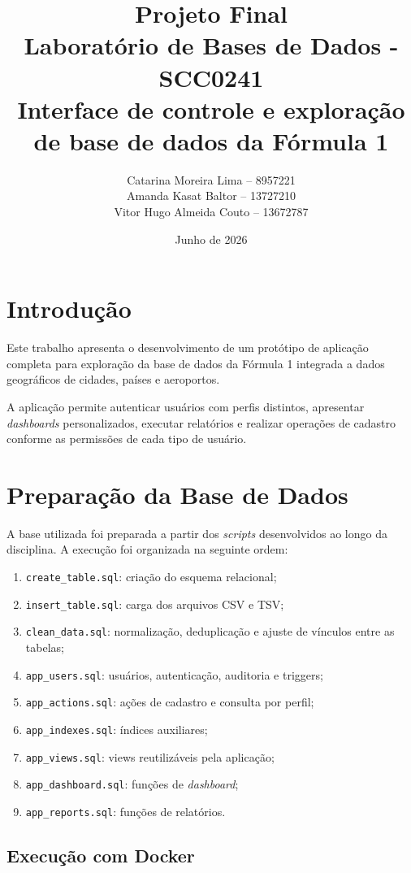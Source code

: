 \documentclass[12pt,a4paper]{article}
\title{
    \textbf{Projeto Final}\\
    Laboratório de Bases de Dados - SCC0241\\
    Interface de controle e exploração de base de dados da Fórmula 1
}
\author{
    Catarina Moreira Lima -- 8957221 \\
    Amanda Kasat Baltor -- 13727210 \\
    Vitor Hugo Almeida Couto -- 13672787
}
\date{Junho de 2026}
\begin{document}
\maketitle

\section{Introdução}

Este trabalho apresenta o desenvolvimento de um protótipo de aplicação completa para exploração da base de dados da Fórmula 1 integrada a dados geográficos de cidades, países e aeroportos.

A aplicação permite autenticar usuários com perfis distintos, apresentar \textit{dashboards} personalizados, executar relatórios e realizar operações de cadastro conforme as permissões de cada tipo de usuário.

\section{Preparação da Base de Dados}

A base utilizada foi preparada a partir dos \textit{scripts} desenvolvidos ao longo da disciplina. A execução foi organizada na seguinte ordem:

\begin{enumerate}
    \item \texttt{create\_table.sql}: criação do esquema relacional;
    \item \texttt{insert\_table.sql}: carga dos arquivos CSV e TSV;
    \item \texttt{clean\_data.sql}: normalização, deduplicação e ajuste de vínculos entre as tabelas;
    \item \texttt{app\_users.sql}: usuários, autenticação, auditoria e triggers;
    \item \texttt{app\_actions.sql}: ações de cadastro e consulta por perfil;
    \item \texttt{app\_indexes.sql}: índices auxiliares;
    \item \texttt{app\_views.sql}: views reutilizáveis pela aplicação;
    \item \texttt{app\_dashboard.sql}: funções de \textit{dashboard};
    \item \texttt{app\_reports.sql}: funções de relatórios.
\end{enumerate}

\subsection{Execução com Docker}
\end{document}
